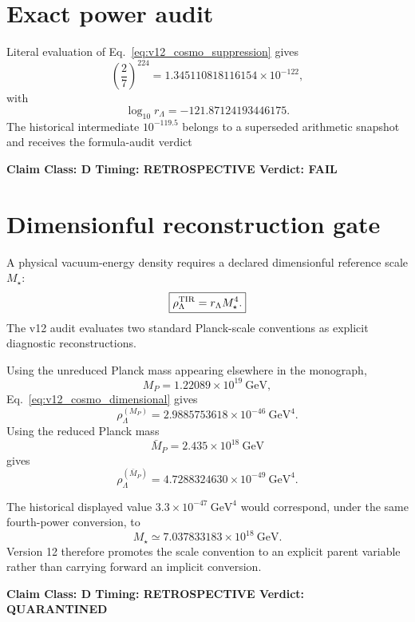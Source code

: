 \documentclass[11pt,a4paper,twoside]{book}
\theoremstyle{definition}
\newcommand{\vTwelveStatus}[3]{\par\noindent\textbf{Claim Class: #1 \quad Timing: #2 \quad Verdict: #3}\par}
\begin{document}
\section{Exact power audit}

Literal evaluation of Eq.~\eqref{eq:v12_cosmo_suppression} gives
\begin{equation}
\boxed{
\left(\frac27\right)^{224}
=1.345110818116154\times10^{-122},
}
\label{eq:v12_cosmo_power}
\end{equation}
with
\begin{equation}
\log_{10}r_\Lambda=-121.87124193446175.
\end{equation}
The historical intermediate $10^{-119.5}$ belongs to a superseded arithmetic snapshot and receives the formula-audit verdict
\vTwelveStatus{D}{RETROSPECTIVE}{FAIL}

\section{Dimensionful reconstruction gate}

A physical vacuum-energy density requires a declared dimensionful reference scale $M_\star$:
\begin{equation}
\boxed{
\rho_\Lambda^{\rm TIR}
=r_\Lambda M_\star^4.
}
\label{eq:v12_cosmo_dimensional}
\end{equation}
The v12 audit evaluates two standard Planck-scale conventions as explicit diagnostic reconstructions.

Using the unreduced Planck mass appearing elsewhere in the monograph,
\begin{equation}
M_P=1.22089\times10^{19}\ \mathrm{GeV},
\end{equation}
Eq.~\eqref{eq:v12_cosmo_dimensional} gives
\begin{equation}
\rho_\Lambda^{(M_P)}
=2.9885753618\times10^{-46}\ \mathrm{GeV}^4.
\end{equation}
Using the reduced Planck mass
\begin{equation}
\bar M_P=2.435\times10^{18}\ \mathrm{GeV}
\end{equation}
gives
\begin{equation}
\rho_\Lambda^{(\bar M_P)}
=4.7288324630\times10^{-49}\ \mathrm{GeV}^4.
\end{equation}

The historical displayed value $3.3\times10^{-47}\ \mathrm{GeV}^4$ would correspond, under the same fourth-power conversion, to
\begin{equation}
M_\star\simeq7.037833183\times10^{18}\ \mathrm{GeV}.
\end{equation}
Version 12 therefore promotes the scale convention to an explicit parent variable rather than carrying forward an implicit conversion.
\vTwelveStatus{D}{RETROSPECTIVE}{QUARANTINED}
\end{document}
